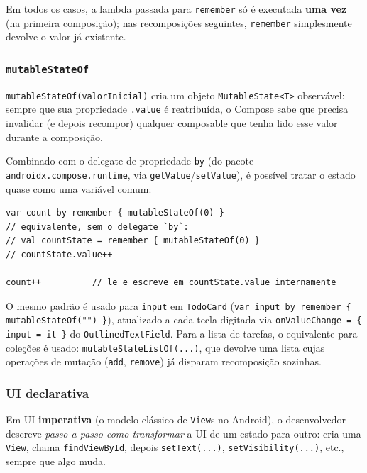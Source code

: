 \documentclass[11pt,a4paper]{article}
\begin{document}
Em todos os casos, a lambda passada para \texttt{remember} só é executada
\textbf{uma vez} (na primeira composição); nas recomposições seguintes,
\texttt{remember} simplesmente devolve o valor já existente.

\subsubsection{\texttt{mutableStateOf}}

\texttt{mutableStateOf(valorInicial)} cria um objeto
\texttt{MutableState<T>} observável: sempre que sua propriedade
\texttt{.value} é reatribuída, o Compose sabe que precisa invalidar (e
depois recompor) qualquer composable que tenha lido esse valor durante a
composição.

Combinado com o delegate de propriedade \texttt{by} (do pacote
\texttt{androidx.compose.runtime}, via \texttt{getValue}/\texttt{setValue}),
é possível tratar o estado quase como uma variável comum:

\begin{lstlisting}[caption={mutableStateOf com o delegate `by`}, label=lst:mutablestateof]
var count by remember { mutableStateOf(0) }
// equivalente, sem o delegate `by`:
// val countState = remember { mutableStateOf(0) }
// countState.value++

count++          // le e escreve em countState.value internamente
\end{lstlisting}

O mesmo padrão é usado para \texttt{input} em \texttt{TodoCard}
(\texttt{var input by remember \{ mutableStateOf("") \}}), atualizado a
cada tecla digitada via \texttt{onValueChange = \{ input = it \}} do
\texttt{OutlinedTextField}. Para a lista de tarefas, o equivalente para
coleções é usado: \texttt{mutableStateListOf(...)}, que devolve uma lista
cujas operações de mutação (\texttt{add}, \texttt{remove}) já disparam
recomposição sozinhas.

\subsubsection{UI declarativa}
\label{sec:declarativa}

Em UI \textbf{imperativa} (o modelo clássico de \texttt{View}s no
Android), o desenvolvedor descreve \emph{passo a passo como transformar}
a UI de um estado para outro: cria uma \texttt{View}, chama
\texttt{findViewById}, depois \texttt{setText(...)},
\texttt{setVisibility(...)}, etc., sempre que algo muda.
\end{document}
